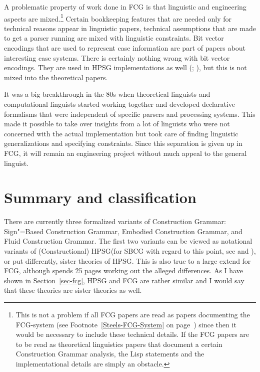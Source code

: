 
A problematic property of work done in FCG is that linguistic and engineering aspects are mixed.\footnote{%
This is not a problem if all FCG papers are read as papers documenting the FCG-system (see
Footnote~\ref{Steels-FCG-System} on page~\pageref{Steels-FCG-System}) since then it
would be necessary to include these technical details. If the FCG papers are to be read as
theoretical linguistics papers that document a certain Construction Grammar analysis, the Lisp statements
and the implementational details are simply an obstacle.
} Certain bookkeeping features that are needed only
for technical reasons appear in linguistic papers, technical assumptions that are made to get a
parser running are mixed with linguistic constraints. Bit vector encodings that are used to
represent case information are part of papers about interesting case systems. There is certainly
nothing wrong with bit vector encodings. They are used in HPSG implementations as well
(\citealp[]{Reape91}; \citealp[]{Babel}), but this is
not mixed into the theoretical papers. 

It was a big breakthrough in the 80s when theoretical linguists and computational linguists started
working together and developed declarative formalisms that were independent of specific parsers and
processing systems. This made it possible to take over insights from a lot of linguists who were not
concerned with the actual implementation but took care of finding linguistic generalizations and
specifying constraints. Since this separation is given up in FCG, it will remain an engineering
project without much appeal to the general linguist.%
\indexhpsgend\indexsbcgend



\section{Summary and classification}

\begin{sloppypar}
There are currently three formalized variants of Construction Grammar: Sign"=Based Construction
Grammar, Embodied Construction Grammar, and Fluid Construction Grammar. The first two variants can
be viewed as notational variants of (Constructional) HPSG\indexhpsg (for SBCG with regard to this
point, see  and ), or put differently, sister
theories of HPSG. This is also true to a large extend for FCG, although \citet{vanTrijp2013a} spends
25 pages working out the alleged differences. As I have shown in Section~\ref{sec-fcg}, HPSG and FCG are
rather similar and I would say that these theories are sister theories as well. 
\end{sloppypar}

